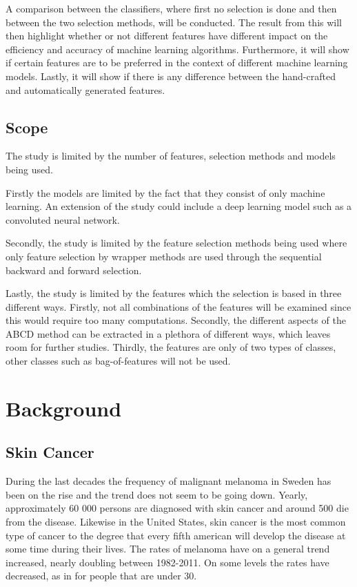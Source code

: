 \documentclass{kththesis}
\begin{document}
A comparison between the classifiers, where first no selection is done and then between the two selection methods, will be conducted. The result from this will then highlight whether or not different features have different impact on the efficiency and accuracy of machine learning algorithms. Furthermore, it will show if certain features are to be preferred in the context of different machine learning models. Lastly, it will show if there is any difference between the hand-crafted and automatically generated features.

\section{Scope}

The study is limited by the number of features, selection methods and models being used.

Firstly the models are limited by the fact that they consist of only machine learning. An extension of the study could include a deep learning model such as a convoluted neural network.

Secondly, the study is limited by the feature selection methods being used where only feature selection by wrapper methods are used through the sequential backward and forward selection.

Lastly, the study is limited by the features which the selection is based in three different ways. Firstly, not all combinations of the features will be examined since this would require too many computations. Secondly, the different aspects of the ABCD method can be extracted in a plethora of different ways, which leaves room for further studies. Thirdly, the features are only of two types of classes, other classes such as bag-of-features will not be used.


\chapter{Background}

\section{Skin Cancer}


During the last  decades the frequency of malignant melanoma in Sweden has been on the rise and the trend does not seem to be going down. Yearly, approximately 60 000 persons are diagnosed with skin cancer and around 500 die from the disease.%
Likewise in the United States, skin cancer is the most common type of cancer to the degree that every fifth american will develop the disease at some time during their lives. The rates of melanoma have on a general trend increased, nearly doubling between 1982-2011. On some levels the rates have decreased, as in for people that are under 30. %
\end{document}
